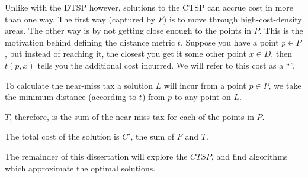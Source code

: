 Unlike with the DTSP however, solutions to the CTSP can accrue cost in more than one way. The first way (captured by $F$) is to move through high-cost-density areas. The other way is by not getting close enough to the points in $P$. This is the motivation behind defining the distance metric $t$. Suppose you have a point $p\in P$, but instead of reaching it, the closest you get it some other point $x\in D$, then $t(p,x)$ tells you the additional cost incurred. We will refer to this cost as a ``''.

To calculate the near-miss tax a solution $L$ will incur from a point $p\in P$, we take the minimum distance (according to $t$) from $p$ to any point on $L$.

$T$, therefore, is the sum of the near-miss tax for each of the points in $P$.

The total cost of the solution is $C'$, the sum of $F$ and $T$.

\todo[Illustration]

The remainder of this dissertation will explore the $CTSP$, and find algorithms which approximate the optimal solutions.

